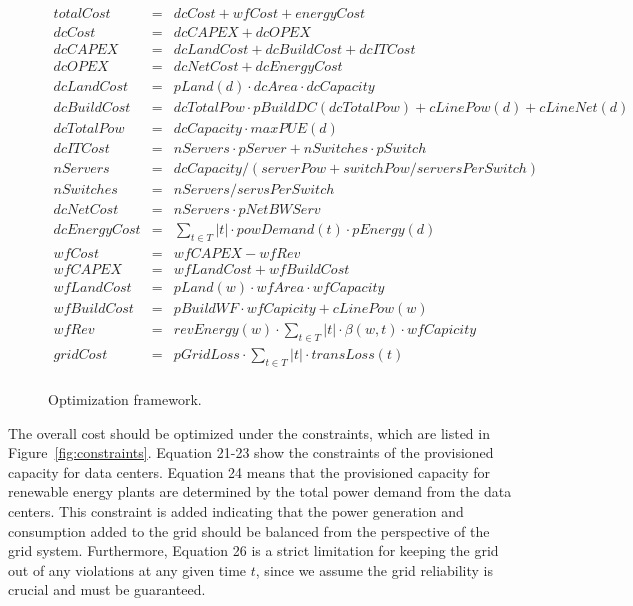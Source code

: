 \begin{figure*}
\begin{eqnarray}
	totalCost & = & dcCost + wfCost + energyCost \\
	dcCost & = & dcCAPEX + dcOPEX \\
        dcCAPEX & = & dcLandCost + dcBuildCost + dcITCost \\
        dcOPEX & = & dcNetCost + dcEnergyCost \\
        dcLandCost & = & pLand(d) \cdot dcArea \cdot dcCapacity \\
        dcBuildCost & = & dcTotalPow \cdot pBuildDC(dcTotalPow) +
            cLinePow(d) + cLineNet(d) \\
        dcTotalPow & = & dcCapacity \cdot maxPUE(d) \\
        dcITCost & = & nServers \cdot pServer + nSwitches \cdot
            pSwitch \\
        nServers & = & dcCapacity / (serverPow + switchPow / serversPerSwitch)\\
        nSwitches & = & nServers / servsPerSwitch\\
        dcNetCost & = & nServers \cdot pNetBWServ \\
        dcEnergyCost & = & \sum_{t \in T} {|t| \cdot powDemand(t) \cdot pEnergy(d) } \\
 	wfCost & = & wfCAPEX - wfRev  \\
        wfCAPEX & = & wfLandCost + wfBuildCost \\
        wfLandCost & = & pLand(w) \cdot wfArea \cdot wfCapacity \\
        wfBuildCost & = & pBuildWF \cdot wfCapicity + cLinePow(w) \\
        wfRev & = & revEnergy(w) \cdot  \sum_{t \in T}{ |t| \cdot
            \beta(w,t) \cdot wfCapicity } \\
        gridCost & = & pGridLoss \cdot \sum_{t \in T}{ |t| \cdot transLoss(t)} \\%
\end{eqnarray}
\caption{Optimization framework.}
\label{fig:optimization}
\end{figure*}

The overall cost should be optimized under the constraints, which are listed in Figure~\ref{fig:constraints}. Equation 21-23 show the constraints of the provisioned capacity for data centers. Equation 24 means that the provisioned capacity for renewable energy plants are determined by the total power demand from the data centers. This constraint is added indicating that the power generation and consumption added to the grid should be balanced from the perspective of the grid system. Furthermore, Equation 26
is a strict limitation for keeping the grid out of any violations at any given time $t$, since we assume the grid reliability is crucial and must be guaranteed.

